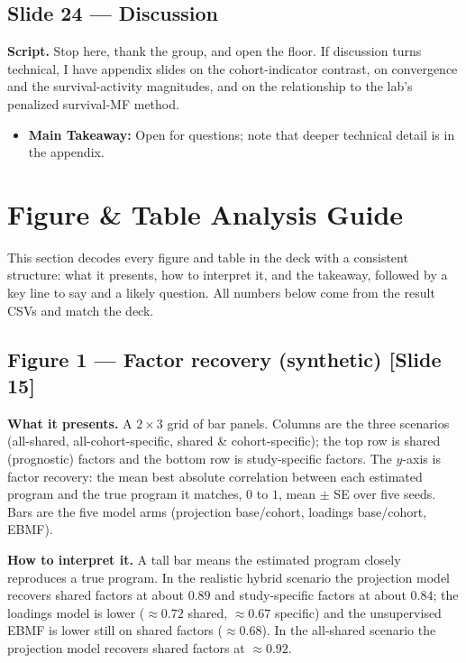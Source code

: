 \documentclass[11pt]{article}
\newcommand{\scriptlabel}{\textbf{Script. }}
\newcommand{\sectionlabel}[1]{\textbf{#1}}
\begin{document}
\subsection*{Slide 24 --- Discussion}
\scriptlabel Stop here, thank the group, and open the floor. If discussion turns technical, I have
appendix slides on the cohort-indicator contrast, on convergence and the survival-activity
magnitudes, and on the relationship to the lab's penalized survival-MF method.

\begin{itemize}
\item \sectionlabel{Main Takeaway:} Open for questions; note that deeper technical detail is in the
appendix.
\end{itemize}

\section*{Figure \& Table Analysis Guide}

This section decodes every figure and table in the deck with a consistent structure: what it
presents, how to interpret it, and the takeaway, followed by a key line to say and a likely
question. All numbers below come from the result CSVs and match the deck.

\subsection*{Figure 1 --- Factor recovery (synthetic) [Slide 15]}
\sectionlabel{What it presents.} A $2 \times 3$ grid of bar panels. Columns are the three scenarios
(all-shared, all-cohort-specific, shared \& cohort-specific); the top row is shared (prognostic)
factors and the bottom row is study-specific factors. The $y$-axis is factor recovery: the mean best
absolute correlation between each estimated program and the true program it matches, $0$ to $1$,
mean $\pm$ SE over five seeds. Bars are the five model arms (projection base/cohort, loadings
base/cohort, EBMF).

\sectionlabel{How to interpret it.} A tall bar means the estimated program closely reproduces a true
program. In the realistic hybrid scenario the projection model recovers shared factors at about
$0.89$ and study-specific factors at about $0.84$; the loadings model is lower ($\approx 0.72$ shared,
$\approx 0.67$ specific) and the unsupervised EBMF is lower still on shared factors ($\approx 0.68$).
In the all-shared scenario the projection model recovers shared factors at $\approx 0.92$.
\end{document}
